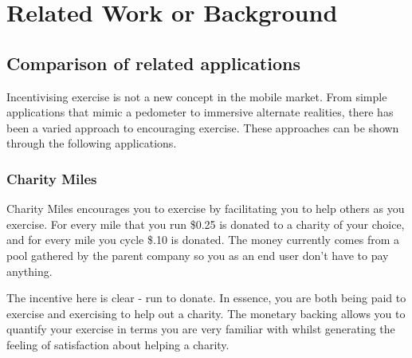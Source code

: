 \chapter{Related Work or Background}\label{ch_background}

\section{Comparison of related applications}
Incentivising exercise is not a new concept in the mobile market. From
simple applications that mimic a pedometer to immersive alternate
realities, there has been a varied approach to encouraging
exercise. These approaches can be shown through the following
applications.


\subsection{Charity Miles}
Charity Miles encourages you to exercise by facilitating you to help
others as you exercise. For every mile that you run \$0.25 is
donated to a charity of your choice, and for every mile you cycle \$.10
is donated. The money currently comes from a pool gathered by the
parent company so you as an end user don't have to pay anything.

The incentive here is clear - run to donate. In essence, you are both
being paid to exercise and exercising to help out a charity. The
monetary backing allows you to quantify your exercise in terms you are
very familiar with whilst generating the feeling of satisfaction about
helping a charity.











